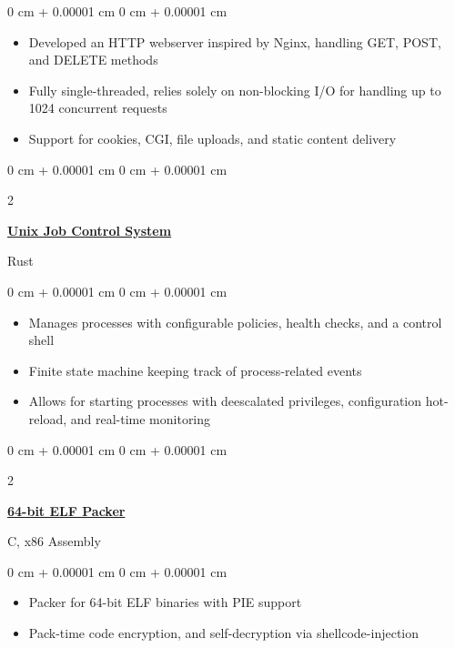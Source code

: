 \documentclass[10pt, letterpaper]{article}
\newenvironment{highlights}{
    \begin{itemize}[
        topsep=0.10 cm,
        parsep=0.10 cm,
        partopsep=0pt,
        itemsep=0pt,
        leftmargin=0 cm + 10pt
    ]
}{
    \end{itemize}
}
\newenvironment{onecolentry}{
    \begin{adjustwidth}{
        0 cm + 0.00001 cm
    }{
        0 cm + 0.00001 cm
    }
}{
    \end{adjustwidth}
}
\newenvironment{twocolentry}[2][]{
    \onecolentry
    \def\secondColumn{#2}
    \setcolumnwidth{\fill, 4.5 cm}
    \begin{paracol}{2}
}{
    \switchcolumn \raggedleft \secondColumn
    \end{paracol}
    \endonecolentry
}
\begin{document}
    \vspace{0.10 cm}
    
    \begin{onecolentry}
        \begin{highlights}
            \item Developed an HTTP webserver inspired by Nginx, handling GET, POST, and DELETE methods
            \item Fully single-threaded, relies solely on non-blocking I/O for handling up to 1024 concurrent requests
            \item Support for cookies, CGI, file uploads, and static content delivery
        \end{highlights}
    \end{onecolentry}

    \vspace{0.2 cm}

    \begin{twocolentry}
        {Rust}
        \href{https://github.com/winstonallo/taskmaster}{\textbf{Unix Job Control System}}
    \end{twocolentry}

    \vspace{0.10 cm}
    
    \begin{onecolentry}
        \begin{highlights}
            \item Manages processes with configurable policies, health checks, and a control shell
            \item Finite state machine keeping track of process-related events
            \item Allows for starting processes with deescalated privileges, configuration hot-reload, and real-time monitoring 
        \end{highlights}
    \end{onecolentry}

    \vspace{0.2cm}

    \begin{twocolentry}
        {C, x86 Assembly}
        \href{https://github.com/winstonallo/woody-woodpacker}{\textbf{64-bit ELF Packer}}
    \end{twocolentry}

    \vspace{0.10 cm}

    \begin{onecolentry}
        \begin{highlights}
            \item Packer for 64-bit ELF binaries with PIE support
            \item Pack-time code encryption, and self-decryption via shellcode-injection
        \end{highlights}
    \end{onecolentry}
\end{document}
